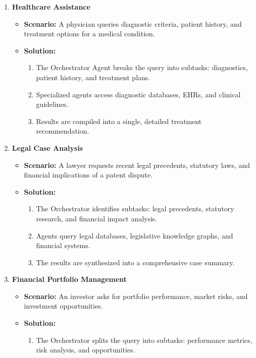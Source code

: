 \documentclass[12pt]{article}
\begin{document}
\begin{enumerate}
\newpage
    \item \textbf{Healthcare Assistance}
    \begin{itemize}
        \item \textbf{Scenario:} A physician queries diagnostic criteria, patient history, and treatment options for a medical condition.
        \item \textbf{Solution:}
        \begin{enumerate}
            \item The Orchestrator Agent breaks the query into subtasks: diagnostics, patient history, and treatment plans.
            \item Specialized agents access diagnostic databases, EHRs, and clinical guidelines.
            \item Results are compiled into a single, detailed treatment recommendation.
        \end{enumerate}
    \end{itemize}
    \item \textbf{Legal Case Analysis}
    \begin{itemize}
        \item \textbf{Scenario:} A lawyer requests recent legal precedents, statutory laws, and financial implications of a patent dispute.
        \item \textbf{Solution:}
        \begin{enumerate}
            \item The Orchestrator identifies subtasks: legal precedents, statutory research, and financial impact analysis.
            \item Agents query legal databases, legislative knowledge graphs, and financial systems.
            \item The results are synthesized into a comprehensive case summary.
        \end{enumerate}
    \end{itemize}
    \item \textbf{Financial Portfolio Management}
    \begin{itemize}
        \item \textbf{Scenario:} An investor asks for portfolio performance, market risks, and investment opportunities.
        \item \textbf{Solution:}
        \begin{enumerate}
            \item The Orchestrator splits the query into subtasks: performance metrics, risk analysis, and opportunities.

\end{enumerate}
\end{itemize}
\end{enumerate}
\end{document}
